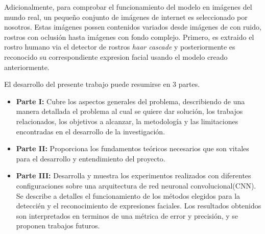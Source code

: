 Adicionalmente, para comprobar el funcionamiento del modelo en imágenes del mundo real, un pequeño conjunto de imágenes de internet es seleccionado por nosotros. Estas imágenes possen contenidos variados desde imágenes de con ruido, rostros con oclusión hasta imágenes con fondo complejo. Primero, es extraido el rostro humano via el detector de rostros \textit{haar cascade} y posteriormente es reconocido su correspondiente expresion facial usando el modelo creado anteriormente.

El desarrollo del presente trabajo puede resumirse en 3 partes.

\begin{itemize}
\item \textbf{Parte I:} Cubre los aspectos generales del problema, describiendo de una manera detallada el problema al cual se quiere dar solución, los trabajos relacionados, los objetivos a alcanzar, la metodología y las limitaciones encontradas en el desarrollo de la investigación.
\item \textbf{Parte II:} Proporciona los fundamentos teóricos necesarios que son vitales para el desarrollo y entendimiento del proyecto.
\item \textbf{Parte III:} Desarrolla y muestra los experimentos realizados con diferentes configuraciones sobre una arquitectura de red neuronal convolucional(CNN). Se describe a detalles el funcionamiento de los métodos elegidos para la deteccién y el reconocimiento de expresiones faciales. Los resultados obtenidos son interpretados en terminos de una métrica de error y precisión, y se proponen trabajos futuros.

 
 
  
\end{itemize}





